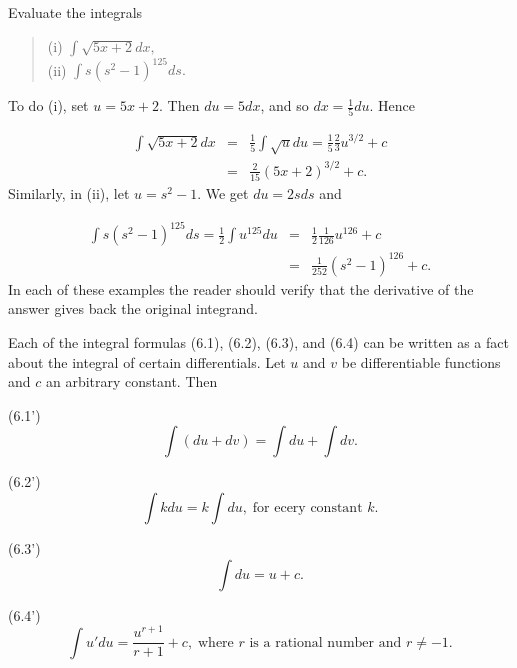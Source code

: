 \begin{example}
Evaluate the integrals

\begin{quote}
\begin{description}
\item[(i)  $\int \sqrt{5x + 2} dx,$]
\item[(ii) $\int s(s^2 - 1)^{125} ds.$]

\end{description}
\end{quote}
\noindent To do (i), set $u = 5x + 2$. Then $du = 5 dx$, and so $dx = \frac{1}{5} du$. Hence

\begin{eqnarray*}
\int \sqrt{5x + 2} dx 
&=& \frac{1}{5} \int \sqrt{u} du = \frac{1}{5}\frac{2}{3} u^{3/2} + c \\
&=& \frac{2}{15}(5x + 2)^{3/2} + c.
\end{eqnarray*}
\noindent Similarly, in (ii), let $u = s^2 - 1$. We get $du = 2s ds$ and

\begin{eqnarray*}
\int s(s^2 - 1)^{125} ds = \frac{1}{2} \int u^{125} du 
&=& \frac{1}{2} \frac{1}{126} u^{126} + c  \\
&=& \frac{1}{252} (s^2 - 1)^{126} + c.
\end{eqnarray*}
\noindent In each of these examples the reader should verify that the derivative of the answer gives back the original integrand.
\end{example}
\medskip

Each of the integral formulas (6.1), (6.2), (6.3), and (6.4) can be written as a fact about the integral of certain differentials. Let $u$ and $v$ be
differentiable functions and $c$ an arbitrary constant. Then

\begin{theorem} (6.1')
$$\int (du + dv) = \int du + \int dv.$$
\end{theorem}

\begin{theorem} (6.2')
$$
\int k du = k \int du,\; \mbox{for ecery constant $k$}.
$$
\end{theorem}

\begin{theorem} (6.3')
$$\int du = u + c.$$
\end{theorem}

\begin{theorem} (6.4') 
$$\int u' du = \frac{u ^{r + 1}}{r + 1} + c, \;\mbox{where $r$ is a rational number and $r \neq -1$}.$$
\end{theorem}
